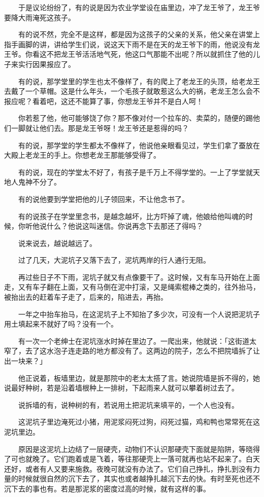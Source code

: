 \documentclass[UTF8]{ctexart}
\begin{document}
　　于是议论纷纷了，有的说是因为农业学堂设在庙里边，冲了龙王爷了，龙王爷要降大雨淹死这孩子。

　　有的说不然，完全不是这样，都是因为这孩子的父亲的关系，他父亲在讲堂上指手画脚的讲，讲给学生们说，说这天下雨不是在天的龙王爷下的雨，他说没有龙王爷。你看这不把龙王爷活活地气死，他这口气那能不出呢？所以就抓住了他的儿子来实行因果报应了。

　　有的说，那学堂里的学生也太不像样了，有的爬上了老龙王的头顶，给老龙王去戴了一个草帽。这是什么年头，一个毛孩子就敢惹这么大的祸，老龙王怎么会不报应呢？看着吧，这还不能算了事，你想龙王爷并不是白人呵！

　　你若惹了他，他可能够饶了你？那不像对付一个拉车的、卖菜的，随便的踢他们一脚就让他们去。那是龙王爷呀！龙王爷还是惹得的吗？

　　有的说，那学堂的学生都太不像样了，他说他亲眼看见过，学生们拿了蚕放在大殿上老龙王的手上。你想老龙王那能够受得了。

　　有的说，现在的学堂太不好了，有孩子是千万上不得学堂的。一上了学堂就天地人鬼神不分了。

　　有的说他要到学堂把他的儿子领回来，不让他念书了。

　　有的说孩子在学堂里念书，是越念越坏，比方吓掉了魂，他娘给他叫魂的时候，你听他说什么？他说这叫迷信。你说再念下去那还了得吗？

　　说来说去，越说越远了。

　　过了几天，大泥坑子又落下去了，泥坑两岸的行人通行无阻。

　　再过些日子不下雨，泥坑子就又有点像要干了。这时候，又有车马开始在上面走，又有车子翻在上面，又有马倒在泥中打滚，又是绳索棍棒之类的，往外抬马，被抬出去的赶着车子走了，后来的，陷进去，再抬。

　　一年之中抬车抬马，在这泥坑子上不知抬了多少次，可没有一个人说把泥坑子用土填起来不就好了吗？没有一个。

　　有一次一个老绅士在泥坑涨水时掉在里边了。一爬出来，他就说：「这街道太窄了，去了这水泡子连走路的地方都没有了。这两边的院子，怎么不把院墙拆了让出一块来？」

　　他正说着，板墙里边，就是那院中的老太太搭了言。她说院墙是拆不得的，她说最好种树，若是沿着墙根种上一排树，下起雨来人就可以攀着树过去了。

　　说拆墙的有，说种树的有，若说用土把泥坑来填平的，一个人也没有。

　　这泥坑子里边淹死过小猪，用泥浆闷死过狗，闷死过猫，鸡和鸭也常常死在这泥坑里边。

　　原因是这泥坑上边结了一层硬壳，动物们不认识那硬壳下面就是陷阱，等晓得了可也就晚了。它们跑着或是飞着，等往那硬壳上一落可就再也站不起来了。白天还好，或者有人又要来施救。夜晚可就没有办法了。它们自己挣扎，挣扎到没有力量的时候就很自然的沉下去了，其实也或者越挣扎越沉下去的快。有时至死也还不沉下去的事也有。若是那泥浆的密度过高的时候，就有这样的事。
\end{document}
